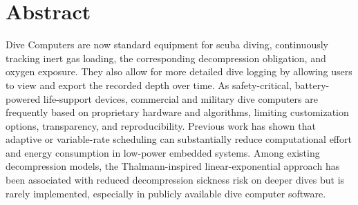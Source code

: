 
\chapter*{Abstract}

Dive Computers are now standard equipment for scuba diving, continuously tracking inert gas loading, the corresponding decompression obligation, and oxygen exposure.
They also allow for more detailed dive logging by allowing users to view and export the recorded depth over time.
As safety-critical, battery-powered life-support devices, commercial and military dive computers are frequently based on proprietary hardware and algorithms, limiting customization options, transparency, and reproducibility.
Previous work has shown that adaptive or variable-rate scheduling can substantially reduce computational effort and energy consumption in low-power embedded systems.
Among existing decompression models, the Thalmann-inspired linear-exponential approach has been associated with reduced decompression sickness risk on deeper dives but is rarely implemented, especially in publicly available dive computer software.


